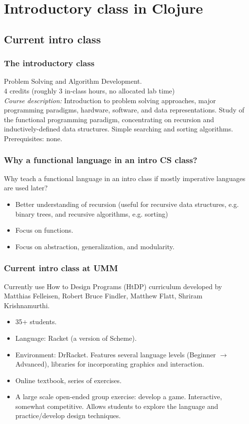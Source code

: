 \documentclass{beamer}
\begin{document}
\section{Introductory class in Clojure}

\subsection{Current intro class}

\begin{frame}
  \frametitle{The introductory class}
Problem Solving and Algorithm Development. \\[1.2ex]

4 credits (roughly 3 in-class hours, no allocated lab time) \\[2ex]

{\it Course description: }Introduction to problem solving approaches, major programming paradigms, hardware, software, and data representations. Study of the functional programming paradigm, concentrating on recursion and inductively-defined data structures. Simple searching and sorting algorithms.
Prerequisites: none. 
\end{frame}

\begin{frame}
  \frametitle{Why a functional language in an intro CS class?}
Why teach a functional language in an intro class if mostly imperative languages are used later? 
\begin{itemize}
\item Better understanding of recursion (useful for recursive data structures, e.g. binary trees, and recursive algorithms, e.g. sorting)
\item Focus on functions.
\item Focus on abstraction, generalization, and modularity. 
\end{itemize}
\end{frame}


\begin{frame}
  \frametitle{Current intro class at UMM}
Currently use How to Design Programs (HtDP) curriculum developed by Matthias Felleisen, Robert Bruce Findler, Matthew Flatt, Shriram Krishnamurthi. 
\begin{itemize}
\item 35+ students. 
\item Language: Racket (a version of Scheme).
\item Environment: DrRacket. Features several language levels (Beginner $\to$ Advanced), libraries for incorporating graphics and interaction. 
\item Online textbook, series of exercises.
\item A large scale open-ended group exercise: develop a game. Interactive, somewhat competitive. Allows students to explore the language and practice/develop design techniques. 
\end{itemize}
\end{frame}
\end{document}
